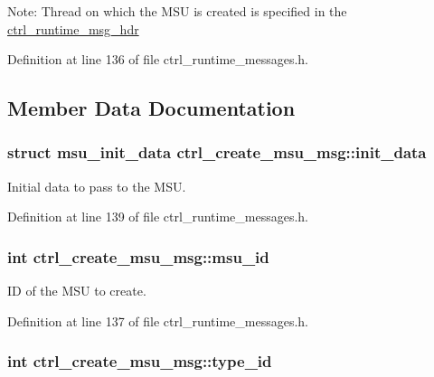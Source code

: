 Note\-: Thread on which the M\-S\-U is created is specified in the \hyperlink{structctrl__runtime__msg__hdr}{ctrl\-\_\-runtime\-\_\-msg\-\_\-hdr} 

Definition at line 136 of file ctrl\-\_\-runtime\-\_\-messages.\-h.



\subsection{Member Data Documentation}
\hypertarget{structctrl__create__msu__msg_acb66d3835b590481831542308c79cc93}{
\subsubsection[{init\-\_\-data}]{\setlength{\rightskip}{0pt plus 5cm}struct {\bf msu\-\_\-init\-\_\-data} ctrl\-\_\-create\-\_\-msu\-\_\-msg\-::init\-\_\-data}}\label{structctrl__create__msu__msg_acb66d3835b590481831542308c79cc93}


Initial data to pass to the M\-S\-U. 



Definition at line 139 of file ctrl\-\_\-runtime\-\_\-messages.\-h.

\hypertarget{structctrl__create__msu__msg_aec871367234b4ccbd2e60c0e15bc25f3}{
\subsubsection[{msu\-\_\-id}]{\setlength{\rightskip}{0pt plus 5cm}int ctrl\-\_\-create\-\_\-msu\-\_\-msg\-::msu\-\_\-id}}\label{structctrl__create__msu__msg_aec871367234b4ccbd2e60c0e15bc25f3}


I\-D of the M\-S\-U to create. 



Definition at line 137 of file ctrl\-\_\-runtime\-\_\-messages.\-h.

\hypertarget{structctrl__create__msu__msg_a18fff65123f61b0f764841d1e9363dcf}{
\subsubsection[{type\-\_\-id}]{\setlength{\rightskip}{0pt plus 5cm}int ctrl\-\_\-create\-\_\-msu\-\_\-msg\-::type\-\_\-id}}\label{structctrl__create__msu__msg_a18fff65123f61b0f764841d1e9363dcf}


